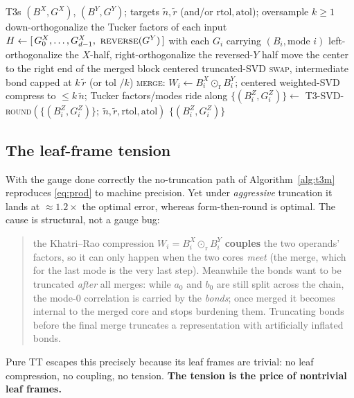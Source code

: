 \documentclass[11pt]{article}
\newcommand{\krrow}{\odot_{\mathrm{r}}}     %
\newcommand{\rtil}{\tilde{r}}
\newcommand{\ntil}{\tilde{n}}
\begin{document}
\begin{algorithm}[t]
\caption{\textsc{T3M-swap} --- Hadamard product of two Tucker tensor trains}
\label{alg:t3m}
\begin{algorithmic}[1]
\Require T3s $(B^X,G^X)$, $(B^Y,G^Y)$; targets $\ntil,\rtil$ (and/or $\mathrm{rtol},\mathrm{atol}$); oversample $k\ge1$
\State down-orthogonalize the Tucker factors of each input 
\State $H \gets [\,G^X_0,\dots,G^X_{d-1},\ \textsc{reverse}(G^Y)\,]$ with each $G_i$ carrying $(B_i,\text{mode }i)$
\State left-orthogonalize the $X$-half, right-orthogonalize the reversed-$Y$ half 
  \State move the center to the right end of the merged block
    \State centered truncated-SVD \textsc{swap}, intermediate bond capped at $k\,\rtil$ (or tol $/k$) 
  \EndFor
  \State \textsc{merge}: $W_i\gets B^X_i\krrow B^Y_i$; centered weighted-SVD compress to $\le k\,\ntil$; Tucker factors/modes ride along
\EndFor
{}
  \State $\{(B^Z_i,G^Z_i)\}\gets$ \textsc{T3-SVD-round}$(\{(B^Z_i,G^Z_i)\};\ \ntil,\rtil,\mathrm{rtol},\mathrm{atol})$ 
\EndIf
\State \Return $\{(B^Z_i,G^Z_i)\}$
\end{algorithmic}
\end{algorithm}

\subsection{The leaf-frame tension}
With the gauge done correctly the no-truncation path of Algorithm~\ref{alg:t3m}
reproduces \eqref{eq:prod} to machine precision. Yet under \emph{aggressive}
truncation it lands at $\approx1.2\times$ the optimal error, whereas
form-then-round is optimal. The cause is structural, not a gauge bug:
\begin{quote}
the Khatri--Rao compression $W_i\!=\!B^X_i\krrow B^Y_i$ \textbf{couples} the two
operands' factors, so it can only happen when the two cores \emph{meet} (the merge,
which for the last mode is the very last step). Meanwhile the bonds want to be
truncated \emph{after} all merges: while $a_0$ and $b_0$ are still split across the
chain, the mode-$0$ correlation is carried by the \emph{bonds}; once merged it
becomes internal to the merged core and stops burdening them. Truncating bonds
before the final merge truncates a representation with artificially inflated bonds.
\end{quote}
Pure TT escapes this precisely because its leaf frames are trivial: no leaf
compression, no coupling, no tension. \textbf{The tension is the price of
nontrivial leaf frames.}
\end{document}
